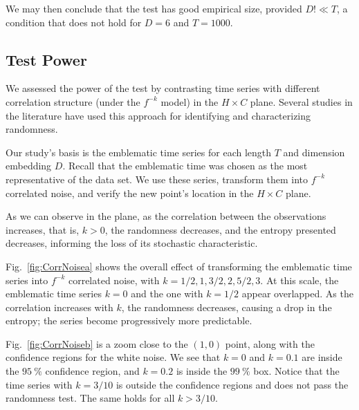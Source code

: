 \documentclass[alpha-refs]{wiley-article}
\begin{document}
We may then conclude that the test has good empirical size, provided $D!\ll T$, a condition that does not hold for $D=6$ and $T=1000$.


\subsection{Test Power}

We assessed the power of the test by contrasting time series with different correlation structure (under the $f^{-k}$ model) in the $H \times C$ plane.
Several studies in the literature have used this approach for identifying and characterizing randomness.

Our study's basis is the emblematic time series for each length $T$ and dimension embedding $D$.
Recall that the emblematic time was chosen as the most representative of the data set.
We use these series, transform them into $f^{-k}$ correlated noise, and verify the new point's location in the $H\times C$ plane.

As we can observe in the plane, as the correlation between the observations increases, that is, $k > 0$, the randomness decreases, and the entropy presented decreases, informing the loss of its stochastic characteristic.

Fig.~\ref{fig:CorrNoisea} shows the overall effect of transforming the emblematic time series into $f^{-k}$ correlated noise, with $k=1/2,1,3/2,2,5/2,3$.
At this scale, the emblematic time series $k=0$ and the one with $k=1/2$ appear overlapped.
As the correlation increases with $k$, the randomness decreases, causing a drop in the entropy; the series become progressively more predictable.

Fig.~\ref{fig:CorrNoiseb} is a zoom close to the $(1,0)$ point, along with the confidence regions for the white noise.
We see that $ k = 0 $ and $ k = 0.1 $ are inside the $\SI{95}{\percent}$ confidence region, and $ k = 0.2 $ is inside the $\SI{99}{\percent}$ box.
Notice that the time series with $k=3/10$ is outside the confidence regions and does not pass the randomness test.
The same holds for all $k>3/10$.
\end{document}

